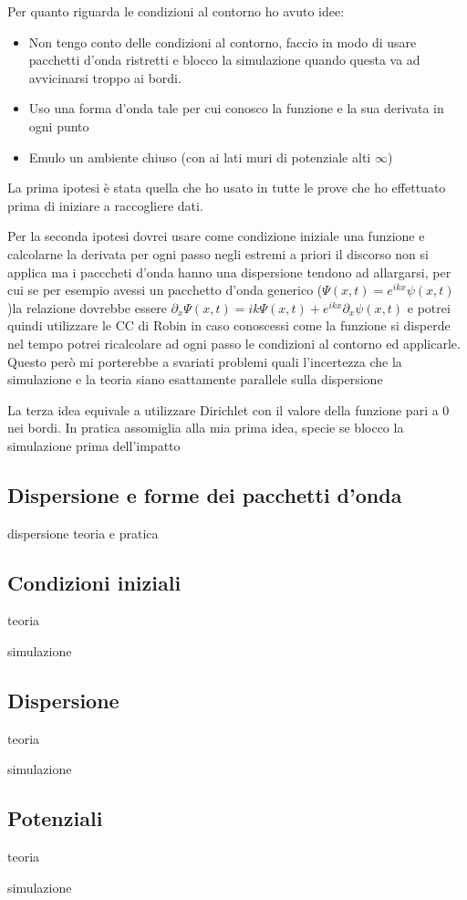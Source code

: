 Per quanto riguarda le condizioni al contorno ho avuto idee:
\begin{itemize}
	\item Non tengo conto delle condizioni al contorno, faccio in modo di usare pacchetti d'onda ristretti e blocco la simulazione quando questa va ad  avvicinarsi troppo ai bordi.
	\item Uso una forma d'onda tale per cui conosco la funzione e la sua derivata in ogni punto
	\item Emulo un ambiente chiuso (con ai lati muri di potenziale alti $\infty$)
\end{itemize}
La prima ipotesi \`e stata quella che ho usato in tutte le prove che ho effettuato prima di iniziare a raccogliere dati.

Per la seconda ipotesi dovrei usare come condizione iniziale una funzione e calcolarne la derivata per ogni passo negli estremi a priori il discorso non si applica ma i pacccheti d'onda hanno una dispersione tendono ad allargarsi, per cui se  per esempio avessi un pacchetto d'onda generico ($\Psi(x,t) = e^{ikx} \psi(x,t)$)la relazione dovrebbe essere $\partial_x \Psi(x,t) = ik \Psi(x,t) + e^{ikx}\partial_x\psi(x,t)$ e potrei quindi utilizzare le CC di Robin in caso conoscessi come la funzione si disperde nel tempo potrei ricalcolare ad ogni passo le condizioni al contorno ed applicarle. Questo per\`o mi porterebbe a svariati problemi quali l'incertezza che la simulazione e la teoria siano esattamente parallele sulla dispersione 

La terza idea equivale a utilizzare Dirichlet con il valore della funzione pari a 0 nei bordi. In pratica assomiglia alla mia prima idea, specie se blocco la simulazione prima dell'impatto

\subsection{Dispersione e forme dei pacchetti d'onda}
dispersione teoria e pratica
\subsection{Condizioni iniziali}
teoria

simulazione
\subsection{Dispersione}
teoria

simulazione
\subsection{Potenziali}
teoria

simulazione